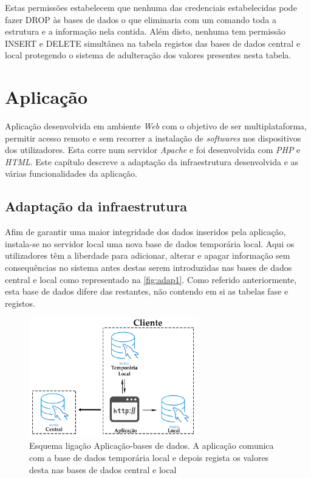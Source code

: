 \documentclass[11pt,twoside,a4paper]{report}
\begin{document}
Estas permissões estabelecem que nenhuma das credenciais estabelecidas pode fazer DROP às bases de dados o que eliminaria com um comando toda a estrutura e a informação nela contida. Além disto, nenhuma tem permissão INSERT e DELETE simultânea na tabela registos das bases de dados central e local protegendo o sistema de adulteração dos valores presentes nesta tabela.

\cleardoublepage
\chapter{Aplicação}
Aplicação desenvolvida em ambiente  \textit{Web} com o objetivo de ser multiplataforma, permitir acesso remoto e sem recorrer a instalação de \textit{softwares} nos dispositivos dos utilizadores. Esta corre num servidor \textit{Apache} e foi desenvolvida com \textit{PHP} e \textit{HTML}. Este capítulo descreve a adaptação da infraestrutura desenvolvida e as várias funcionalidades da aplicação.

\section{Adaptação da infraestrutura}
\label{subchap:adap}
Afim de garantir uma maior integridade dos dados inseridos pela aplicação, instala-se no servidor local uma nova base de dados temporária local. Aqui os utilizadores têm a liberdade para adicionar, alterar e apagar informação sem consequências no sistema antes destas serem introduzidas nas bases de dados central e local como representado na \autoref{fig:adap1}. Como referido anteriormente, esta base de dados difere das restantes, não contendo em si as tabelas fase e registos.
\begin{figure}[H]
	\begin{center}
		\includegraphics[width=0.65\textwidth]{Aplicacao_temp_local_central} %
		\caption{Esquema ligação Aplicação-bases de dados. A aplicação comunica com a base de dados temporária local e depois regista os valores desta nas bases de dados central e local}
		\label{fig:adap1}
	\end{center}
\end{figure}
\end{document}
